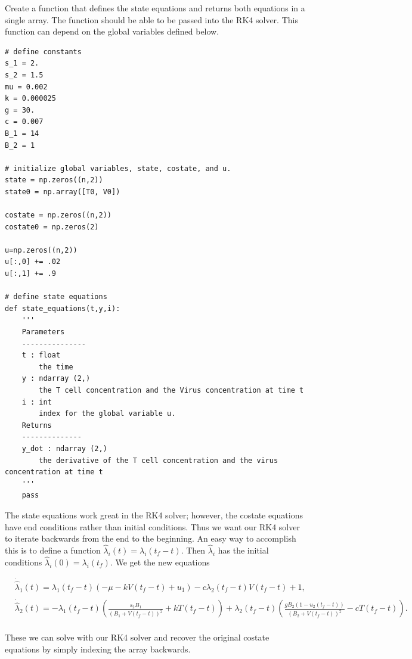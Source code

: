 \begin{problem}
Create a function that defines the state equations and returns both equations in a single array. The function should be able to be passed into the RK4 solver. This function can depend on the global variables defined below.

\begin{lstlisting}
# define constants
s_1 = 2.
s_2 = 1.5
mu = 0.002
k = 0.000025
g = 30.
c = 0.007
B_1 = 14
B_2 = 1

# initialize global variables, state, costate, and u.
state = np.zeros((n,2))
state0 = np.array([T0, V0])
	
costate = np.zeros((n,2))
costate0 = np.zeros(2)

u=np.zeros((n,2))
u[:,0] += .02
u[:,1] += .9

# define state equations
def state_equations(t,y,i):
	'''
	Parameters
	---------------
	t : float
		the time
	y : ndarray (2,)
		the T cell concentration and the Virus concentration at time t
	i : int
		index for the global variable u.
	Returns
	--------------
	y_dot : ndarray (2,)
		the derivative of the T cell concentration and the virus concentration at time t
	'''
	pass
\end{lstlisting}
\label{problem:hiv:state}
\end{problem}


The state equations work great in the RK4 solver; however, the costate equations have end conditions rather than initial conditions. Thus we want our RK4 solver to iterate backwards from the end to the beginning. An easy way to accomplish this is to define a function $ \hat{\lambda}_i(t)=\lambda_i(t_f - t).$ Then $\hat{\lambda}_i$ has the initial conditions $\hat{\lambda}_i(0) = \lambda_i(t_f)$. We get the new equations

\begin{align*}
	 &{ }\dot{\hat{\lambda}}_1(t) = \lambda_1(t_f-t)\left(-\mu - kV(t_f-t) + u_{1}\right) - c\lambda_2(t_f-t)V(t_f-t) + 1, \\
	 \\
     &{ }\dot{\hat{\lambda}}_2(t) = -\lambda_1(t_f-t)\left(\frac{s_2B_1}{(B_1+V(t_f-t))^2}+kT(t_f-t)\right) + \lambda_2(t_f-t)\left(\frac{gB_2(1-u_2(t_f-t))}{(B_2 + V(t_f-t))^2} - cT(t_f-t)\right).\\
\end{align*}

These we can solve with our RK4 solver and recover the original costate equations by simply indexing the array backwards.

